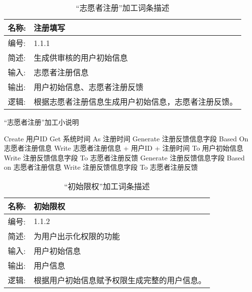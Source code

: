 \begin{table}[H]  
\caption{“志愿者注册”加工词条描述}  
\begin{center}  
    \begin{tabular}{l p{11cm}} 
        \hline
        \quad 名称:  &   注册填写 \\
        \hline
        \quad 编号:  & 1.1.1 \\
        \hline
        \quad 简述:  & 生成供审核的用户初始信息 \\
        \hline
        \quad 输入:  & 志愿者注册信息 \\
        \hline
        \quad 输出:  & 用户初始信息、志愿者注册反馈\\
        \hline
        \quad 逻辑:  & 根据志愿者注册信息生成用户初始信息，志愿者注册反馈。 \\
        \hline
    \end{tabular}
    \label{tab1}
\end{center}
\end{table}

\begin{algorithm}[H]
    \renewcommand{\thealgorithm}{}
    \caption{“志愿者注册”加工小说明} 
    \label{alg3} 
    \begin{algorithmic}[1]
        \STATE Create 用户ID
        \STATE Get 系统时间 As 注册时间
        \STATE Generate 注册反馈信息字段 Based On 志愿者注册信息
        \STATE Write 志愿者注册信息 + 用户ID + 注册时间 To 用户初始信息
        \STATE Write 注册反馈信息字段  To 志愿者注册反馈 
        \ELSE
        \STATE Generate 注册反馈信息字段 Based on 志愿者注册信息
        \STATE Write 注册反馈信息字段 To 志愿者注册反馈 
        \ENDIF 
    \end{algorithmic} 
\end{algorithm}

\begin{table}[H]  
\caption{“初始限权”加工词条描述}  
\begin{center}  
    \begin{tabular}{l p{11cm}} 
        \hline
        \quad 名称:  &   初始限权 \\
        \hline
        \quad 编号:  & 1.1.2 \\
        \hline
        \quad 简述:  & 为用户出示化权限的功能 \\
        \hline
        \quad 输入:  & 用户初始信息 \\
        \hline
        \quad 输出:  & 用户信息 \\
        \hline
        \quad 逻辑:  & 根据用户初始信息赋予权限生成完整的用户信息。 \\
        \hline
    \end{tabular}
    \label{tab1}
\end{center}
\end{table}

